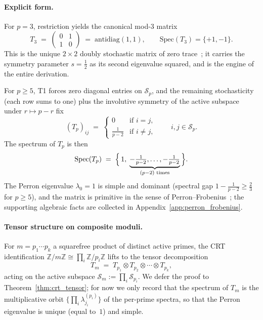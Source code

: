 \paragraph{Explicit form.}
For $p = 3$, restriction yields the canonical mod-3 matrix
\begin{equation}
  T_3 \;=\;
  \begin{pmatrix} 0 & 1 \\ 1 & 0 \end{pmatrix}
  \;=\; \mathrm{antidiag}(1, 1),
  \qquad
  \mathrm{Spec}(T_3) = \{+1, -1\}.
  \label{eq:T3_explicit}
\end{equation}
This is the unique $2 \times 2$ doubly stochastic matrix of zero
trace~\cite[Thm.~T3]{PT_Monograph}; it carries the symmetry parameter
$s = \tfrac12$ as its second eigenvalue squared, and is the engine of
the entire derivation.

For $p \geq 5$, T1 forces zero diagonal entries on $\mathcal{S}_p$, and
the remaining stochasticity (each row sums to one) plus the involutive
symmetry of the active subspace under $r \mapsto p-r$ fix
\begin{equation}
  (T_p)_{ij}
  \;=\;
  \begin{cases}
    0 & \text{if } i = j,\\[2pt]
    \displaystyle \frac{1}{p-2} & \text{if } i \neq j,
  \end{cases}
  \qquad i, j \in \mathcal{S}_p.
  \label{eq:Tp_explicit}
\end{equation}
The spectrum of $T_p$ is then
\begin{equation}
  \mathrm{Spec}(T_p) \;=\;
  \Bigl\{\, 1, \;
            \underbrace{-\tfrac{1}{p-2}, \ldots, -\tfrac{1}{p-2}}_{(p-2)\text{ times}}
       \,\Bigr\}.
  \label{eq:Tp_spectrum}
\end{equation}
The Perron eigenvalue $\lambda_0 = 1$ is simple and dominant
(spectral gap $1 - \tfrac{1}{p-2} \geq \tfrac{2}{3}$ for $p \geq 5$), and the
matrix is primitive in the sense of
Perron--Frobenius~\cite{Seneta2006}; the supporting algebraic facts
are collected in Appendix~\ref{app:perron_frobenius}.

\paragraph{Tensor structure on composite moduli.}
For $m = p_1 \cdots p_k$ a squarefree product of distinct active primes,
the CRT identification $\mathbb{Z}/m\mathbb{Z} \cong \prod_i
\mathbb{Z}/p_i\mathbb{Z}$ lifts to the tensor decomposition
\begin{equation}
  T_m \;=\; T_{p_1} \otimes T_{p_2} \otimes \cdots \otimes T_{p_k},
  \label{eq:Tm_tensor_preview}
\end{equation}
acting on the active subspace
$\mathcal{S}_m := \prod_i \mathcal{S}_{p_i}$. We defer the proof to
Theorem~\ref{thm:crt_tensor}; for now we only record that the spectrum
of $T_m$ is the multiplicative orbit
$\{\prod_i \lambda^{(p_i)}_{j_i}\}$ of the per-prime spectra, so that
the Perron eigenvalue is unique (equal to~$1$) and simple.

